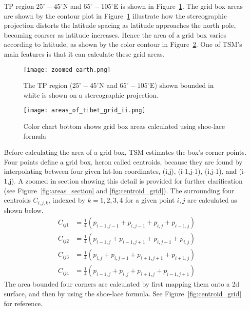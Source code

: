 TP region $25^{\circ}-45^{\circ}$N and $65^{\circ}-105^{\circ}$E is shown in Figure~\ref{fig:show_grid}. The grid box areas are shown by the contour plot in Figure~\ref{fig:show_grid} illustrate how the stereographic projection distorts the latitude spacing as latitude approaches the north pole, becoming coarser as latitude increases. Hence the area of a grid box varies according to latitude, as shown by the color contour in Figure~\ref{fig:areas_row_col}. One of TSM's main features is that it can calculate these grid areas.

\begin{figure}[ht]
\centering
\begin{minipage}{4.5in}
\texttt{[image: zoomed\_earth.png]}\\
\caption{The TP region ($25^{\circ}-45^{\circ}$N and $65^{\circ}-105^{\circ}$E) shown bounded in white is shown on a stereographic projection.}
\label{fig:show_grid}
\end{minipage}
\end{figure}

\begin{figure}[ht]
\centering
\begin{minipage}{6in}
\texttt{[image: areas\_of\_tibet\_grid\_ii.png]}
\caption{Color chart bottom shows grid box areas calculated using shoe-lace formula}
\label{fig:areas_row_col}
\end{minipage}
\end{figure}

Before calculating the area of a grid box, TSM estimates the box's corner points. Four points define a grid box, heron called centroids, because they are found by interpolating between four given lat-lon coordinates, (i,j), (i-1,j-1), (i,j-1), and (i-1,j). A zoomed in section showing this detail is provided for further clarification (see Figure~\ref{fig:areas_section} and \ref{fig:centroid_grid}). 
The surrounding four centroids $C_{i,j,k}$, indexed by $k=1,2,3,4$ for a given point $i,j$ are calculated as shown below.
\begin{align}
C_{ij1} &= \frac{1}{4}( p_{i-1,j-1}+ p_{i,j-1}+ p_{i,j} + p_{i-1,j} ) \\
C_{ij2} &= \frac{1}{4}( p_{i-1,j}+ p_{i-1,j+1} + p_{i,j+1}+ p_{i,j} ) \\
C_{ij3} &= \frac{1}{4}( p_{i,j}+ p_{i,j+1} + p_{i+1,j+1}+ p_{i+1,j} ) \\
C_{ij4} &= \frac{1}{4}( p_{i-1,j}+ p_{i,j} + p_{i+1,j} + p_{i-1,j+1} )
\end{align}
The area bounded four corners are calculated by first mapping them onto a 2d surface, and then by using the shoe-lace formula. See Figure~\ref{fig:centroid_grid} for reference.

